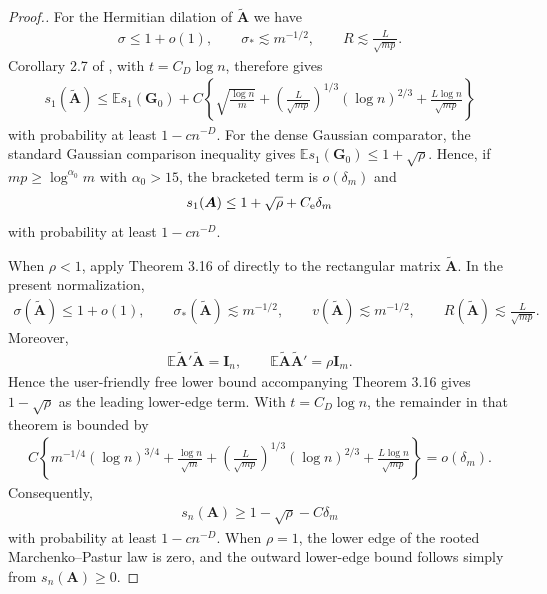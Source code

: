 \documentclass[numsec,webpdf,modern,large,namedate]{oup-authoring-template}
\theoremstyle{plain}
\theoremstyle{remark}
\newif\ifmarkchanges
\newenvironment{revision}{\begingroup\ifmarkchanges\color{red}\fi}{\endgroup}
\begin{document}
\begin{revision}
\begin{proof}[Proof.]
For the Hermitian dilation of $\widetilde{\bm A}$ we have
\begin{align*}
    \sigma\le1+o(1),\qquad
    \sigma_*\lesssim m^{-1/2},\qquad
    R\lesssim\frac{L}{\sqrt{mp}}.
\end{align*}
Corollary 2.7 of \cite{brailovskaya2024universality}, with
$t=C_D\log n$, therefore gives
\begin{align*}
    s_1(\widetilde{\bm A})
    \le \mathbb E s_1(\bm G_0)
    +C\left\{
      \sqrt{\frac{\log n}{m}}
      +\left(\frac{L}{\sqrt{mp}}\right)^{1/3}(\log n)^{2/3}
      +\frac{L\log n}{\sqrt{mp}}
    \right\}
\end{align*}
with probability at least $1-cn^{-D}$.  For the dense Gaussian comparator,
the standard Gaussian comparison inequality gives
$\mathbb E s_1(\bm G_0)\le1+\sqrt\rho$.  Hence, if
$mp\ge\log^{\alpha_0}m$ with $\alpha_0>15$, the bracketed term is
$o(\delta_m)$ and
\begin{align}
\label{eq:supp_sparse_top_edge}
    s_1(\bm A)\le1+\sqrt\rho+C_{\rm e}\delta_m
\end{align}
with probability at least $1-cn^{-D}$.

When $\rho<1$, apply Theorem 3.16 of
\cite{brailovskaya2024universality} directly to the rectangular matrix
$\widetilde{\bm A}$.  In the present normalization,
\begin{align}
\label{eq:supp_rectangular_parameters}
    \sigma(\widetilde{\bm A})\le1+o(1),\qquad
    \sigma_*(\widetilde{\bm A})\lesssim m^{-1/2},\qquad
    v(\widetilde{\bm A})\lesssim m^{-1/2},\qquad
    R(\widetilde{\bm A})\lesssim\frac{L}{\sqrt{mp}}.
\end{align}
Moreover,
\begin{align*}
    \mathbb E\widetilde{\bm A}'\widetilde{\bm A}=\bm I_n,
    \qquad
    \mathbb E\widetilde{\bm A}\widetilde{\bm A}'=\rho\bm I_m.
\end{align*}
Hence the user-friendly free lower bound accompanying Theorem 3.16 gives
$1-\sqrt\rho$ as the leading lower-edge term.  With $t=C_D\log n$, the
remainder in that theorem is bounded by
\begin{align*}
    C\left\{
    m^{-1/4}(\log n)^{3/4}
    +\frac{\log n}{\sqrt m}
    +\left(\frac{L}{\sqrt{mp}}\right)^{1/3}(\log n)^{2/3}
    +\frac{L\log n}{\sqrt{mp}}
    \right\}
    =o(\delta_m).
\end{align*}
Consequently,
\begin{align}
\label{eq:supp_sparse_bottom_edge}
    s_n(\bm A)\ge1-\sqrt\rho-C\delta_m
\end{align}
with probability at least $1-cn^{-D}$.  When $\rho=1$, the lower edge of the
rooted Marchenko--Pastur law is zero, and the outward lower-edge bound follows
simply from $s_n(\bm A)\ge0$.


\end{proof}
\end{revision}
\end{document}
